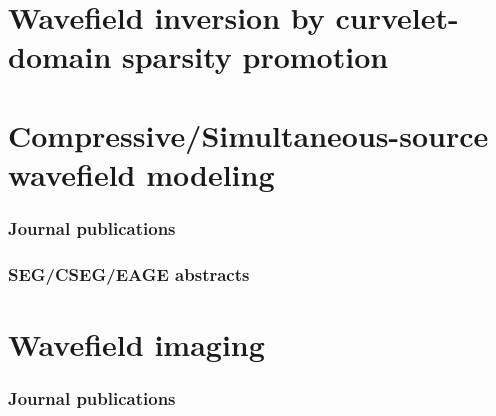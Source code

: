 \documentclass{article}
\begin{document}
\section*{Wavefield inversion by curvelet-domain sparsity promotion}
\label{sec:wavefield-inversion}
\noindent
{} 
\noindent
{} 
\noindent
{} 
\noindent
{}
\noindent
{}
\noindent
{}

\section*{Compressive/Simultaneous-source wavefield modeling}
\label{sec:wavefield-modeling}
%
\subsubsection*{Journal publications}
\label{sec:journal-publications-5}

\noindent
{} 
\noindent
{}


\subsubsection*{SEG/CSEG/EAGE abstracts}
\label{sec:segcs-abstr-2}

\noindent
{} 
\noindent
{} 
\noindent
{}
\noindent
{}
\noindent
{}

\section*{Wavefield imaging}\label{sec:wavefield-imaging}
%
\subsubsection*{Journal publications}
\label{sec:journal-publications-2}

\noindent
{}
\noindent
{}

\end{document}
